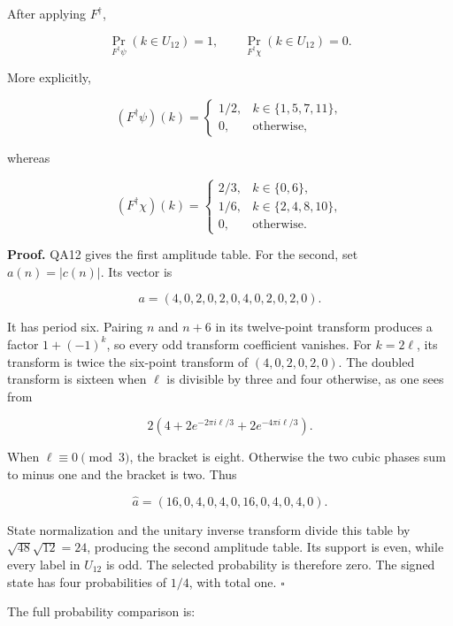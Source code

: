 After applying \(F^\dagger\),

\[
\Pr_{F^\dagger\psi}(k\in U_{12})=1,
\qquad
\Pr_{F^\dagger\chi}(k\in U_{12})=0.
\]

More explicitly,

\[
(F^\dagger\psi)(k)
=\begin{cases}1/2,&k\in\{1,5,7,11\},\\0,&\text{otherwise},\end{cases}
\]

whereas

\[
(F^\dagger\chi)(k)
=\begin{cases}
2/3,&k\in\{0,6\},\\
1/6,&k\in\{2,4,8,10\},\\
0,&\text{otherwise}.
\end{cases}
\]

\textbf{Proof.} QA12 gives the first amplitude table. For the second,
set \(a(n)=|c(n)|\). Its vector is

\[
a=(4,0,2,0,2,0,4,0,2,0,2,0).
\]

It has period six. Pairing \(n\) and \(n+6\) in its twelve-point
transform produces a factor \(1+(-1)^k\), so every odd transform
coefficient vanishes. For \(k=2\ell\), its transform is twice the
six-point transform of \((4,0,2,0,2,0)\). The doubled transform is
sixteen when \(\ell\) is divisible by three and four otherwise, as one
sees from

\[
2\left(4+2e^{-2\pi i\ell/3}+2e^{-4\pi i\ell/3}\right).
\]

When \(\ell\equiv0\pmod3\), the bracket is eight. Otherwise the two
cubic phases sum to minus one and the bracket is two. Thus

\[
\widehat a=(16,0,4,0,4,0,16,0,4,0,4,0).
\]

State normalization and the unitary inverse transform divide this table
by \(\sqrt{48}\sqrt{12}=24\), producing the second amplitude table. Its
support is even, while every label in \(U_{12}\) is odd. The selected
probability is therefore zero. The signed state has four probabilities
of \(1/4\), with total one. \(\square\)

The full probability comparison is:

